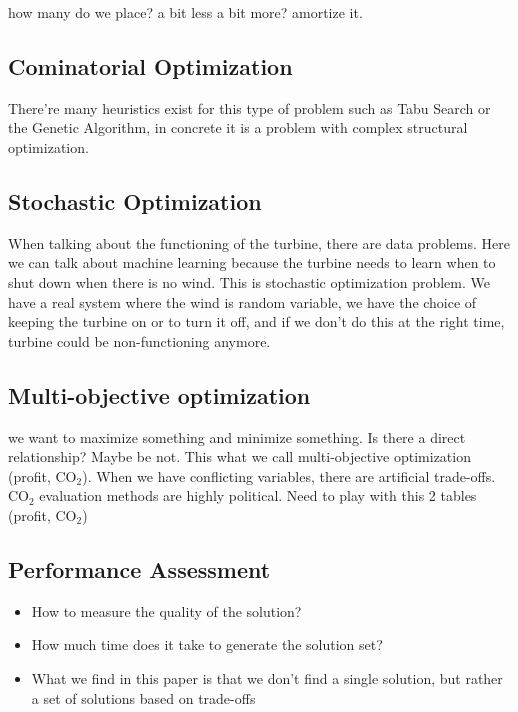 \documentclass[12pt]{article}
\begin{document}
how many do we place? a bit less a bit more? amortize it.

\subsection{Cominatorial Optimization}
There're many heuristics exist for this type of problem such as Tabu Search or the Genetic Algorithm, in concrete it is a problem with complex structural optimization.  

\subsection{Stochastic Optimization}
When talking about the functioning of the turbine, there are data problems. Here we can talk about machine learning because the turbine needs to learn when to shut down when there is no wind. This is stochastic optimization problem. We have a real system where the wind is random variable, we have the choice of keeping the turbine on or to turn it off, and if we don't do this at the right time, turbine could be non-functioning anymore. \\ 

\subsection{Multi-objective optimization}
we want to maximize something and minimize something. Is there a direct relationship?
Maybe be not. This what we call multi-objective optimization (profit, CO$_2$). When we have conflicting variables, there are artificial trade-offs.  \\

CO$_2$ evaluation methods are highly political. Need to play with this 2 tables (profit, CO$_2$)

\subsection{Performance Assessment}
\begin{itemize}
\item How to measure the quality of the solution? 
\item How much time does it take to generate the solution set?
\item What we find in this paper is that we don't find a single solution, but rather a set of solutions based on trade-offs
\end{itemize}


\end{document}
